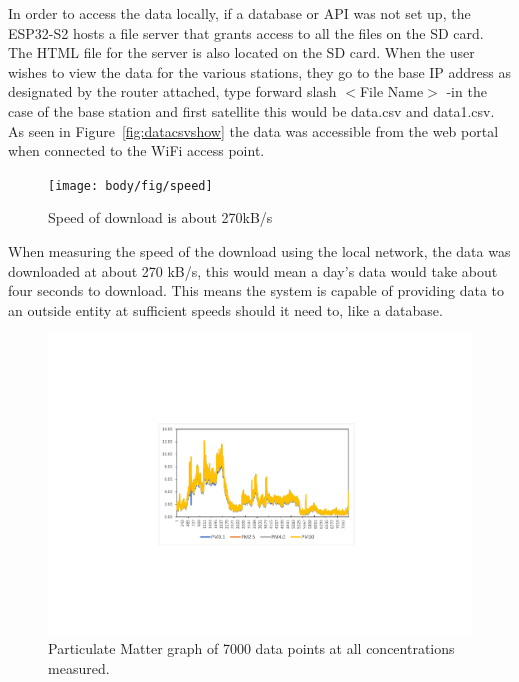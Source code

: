 \noindent
In order to access the data locally, if a database or API was not set up, the ESP32-S2 hosts a file server that grants access to all the files on the SD card. The HTML file for the server is also located on the SD card. When the user wishes to view the data for the various stations, they go to the base IP address as designated by the router attached, type forward slash $<$File Name$>$ -in the case of the base station and first satellite this would be data.csv and data1.csv. As seen in Figure~\ref{fig:datacsvshow} the data was accessible from the web portal when connected to the WiFi access point.

\begin{figure}[!htb]
	\centering
	\texttt{[image: body/fig/speed]}
	\caption{Speed of download is about 270kB/s }
	\label{fig:speed}
\end{figure}

\noindent
When measuring the speed of the download using the local network, the data was downloaded at about 270 kB/s, this would mean a day's data would take about four seconds to download. This means the system is capable of providing data to an outside entity at sufficient speeds should it need to, like a database.



\begin{figure}[!htb]
	\centering
	\includegraphics[width=0.9\linewidth]{body/fig/PMall2.0.pdf}
	\caption[Particulate Matter]{Particulate Matter graph of 7000 data points at all concentrations measured.}
	\label{fig:PMall}
\end{figure}


